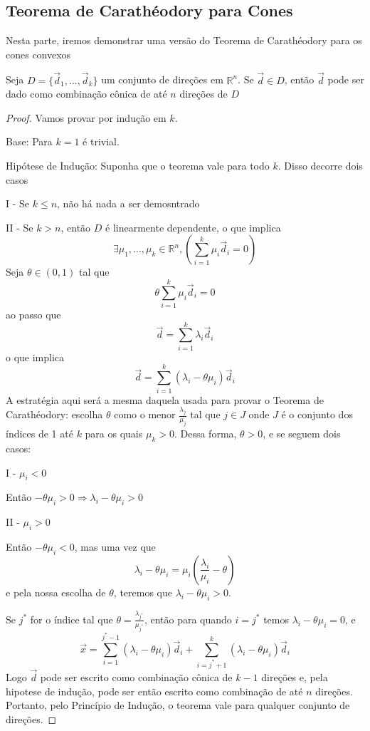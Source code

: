 \subsection{Teorema de Carathéodory para Cones}

Nesta parte, iremos demonstrar uma versão do Teorema de Carathéodory para os
cones convexos

\begin{thm:caratheodory cones}
  Seja $D = \{\vec d_1, \dots, \vec d_k\}$ um conjunto de direções em $\mathbb{R}^n$. Se $\vec{d} \in D$, então
  $\vec{d}$ pode ser dado como combinação cônica de até $n$ direções
  de $D$

  \begin{proof}
   Vamos provar por indução em $k$.

   Base: Para $k=1$ é trivial.

   Hipótese de Indução: Suponha que o teorema vale para todo $k$. Disso decorre
   dois casos

   I - Se $k \leq n$, não há nada a ser demosntrado

   II - Se $k > n$, então $D$ é linearmente dependente, o que implica
   \[
     \exists \mu_1, \dots, \mu_{k} \in \mathbb{R}^n, \left(\sum_{i=1}^{k}\mu_i \vec{d}_i = 0\right)
   \]
   Seja $\theta \in (0, 1)$ tal que
   \[
     \theta \sum_{i=1}^{k} \mu_i \vec{d}_i = 0
   \]
   ao passo que
   \[
     \vec{d} = \sum_{i=1}^{k}\lambda_i\vec{d}_i
   \]
   o que implica
   \[
     \vec{d} = \sum_{i=1}^{k}(\lambda_i - \theta \mu_i)\vec{d}_i
   \]
   A estratégia aqui será a mesma daquela usada para provar o Teorema de
   Carathéodory: escolha $\theta$ como o menor $\frac{\lambda_j}{\mu_j}$ tal que
   $j \in J$ onde $J$ é o conjunto dos índices de 1 até $k$ para os quais
   $\mu_k > 0$. Dessa forma, $\theta > 0$, e se seguem dois casos:

   I - $\mu_i < 0$

   Então $-\theta \mu_i > 0 \Rightarrow \lambda_i - \theta \mu_i > 0$

   II - $\mu_i > 0$

  Então $-\theta \mu_i < 0$, mas uma vez que
  \[
    \lambda_i - \theta \mu_i = \mu_i \left(\frac{\lambda_i}{\mu_i} - \theta\right)
  \]
  e pela nossa escolha de $\theta$, teremos que $\lambda_i - \theta \mu_i > 0$.

  Se $j^*$ for o índice tal que $\theta = \frac{\lambda_{j^*}}{\mu_{j^*}}$,
  então para quando $i = j^*$ temos $\lambda_i - \theta \mu_i = 0$, e
  \[
    \vec x = \sum_{i=1}^{j^*-1} (\lambda_i - \theta \mu_i) \vec d_i + \sum_{i=j^*+1}^{k} (\lambda_i - \theta \mu_i) \vec d_i
  \]
  Logo $\vec d$ pode ser escrito como combinação cônica de $k-1$ direções e,
  pela hipotese de indução, pode ser então escrito como combinação de até
  $n$ direções. Portanto, pelo Princípio de Indução, o teorema vale para
  qualquer conjunto de direções.
  \end{proof}
\end{thm:caratheodory cones}

